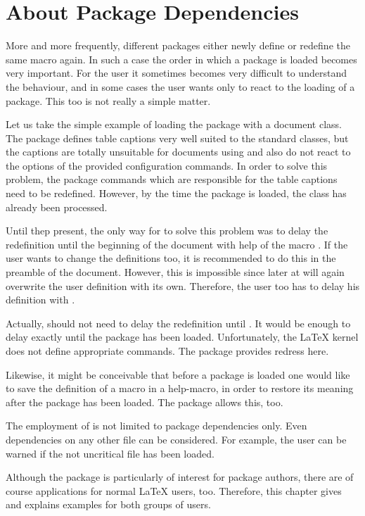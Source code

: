 \section{About Package Dependencies}
\label{sec:scrlfile.dependency}
\begin{Explain}
  More and more frequently, different packages either newly define or
  redefine the same macro again.  In such a case the order in which a
  package is loaded becomes very important.  For the user it sometimes
  becomes very difficult to understand the behaviour, and in some
  cases the user wants only to react to the loading of a package. This
  too is not really a simple matter.

  Let us take the simple example of loading the package
   with a {\KOMAScript} document class.  The
   package defines table captions very well suited
  to the standard classes, but the captions are totally unsuitable for
  documents using {\KOMAScript} and also do not react to the options
  of the provided configuration commands.  In order to solve this
  problem, the  package commands which are
  responsible for the table captions need to be redefined. However, by
  the time the  package is loaded, the
  {\KOMAScript} class has already been processed.

  Until thep present, the only way for {\KOMAScript} to solve this
  problem was to delay the redefinition until the beginning of the
  document with help of the macro .  If the
  user wants to change the definitions too, it is recommended to do
  this in the preamble of the document.  However, this is impossible
  since later at  {\KOMAScript} will
  again overwrite the user definition with its own.  Therefore, the
  user too has to delay his definition with .
  
  Actually, {\KOMAScript} should not need to delay the redefinition
  until .  It would be enough to
  delay exactly until the package  has been
  loaded. Unfortunately, the {\LaTeX} kernel does not define
  appropriate commands. The package  provides
  redress here.
  
  Likewise, it might be conceivable that before a package is loaded
  one would like to save the definition of a macro in a help-macro, in
  order to restore its meaning after the package has been loaded. The
  package  allows this, too.
  
  The employment of  is not limited to package
  dependencies only.  Even dependencies on any other file can be
  considered.  For example, the user can be warned if the not
  uncritical file  has been loaded.
  
  Although the package is particularly of interest for package
  authors, there are of course applications for normal {\LaTeX} users,
  too.  Therefore, this chapter gives and explains examples for both
  groups of users.
\end{Explain}


